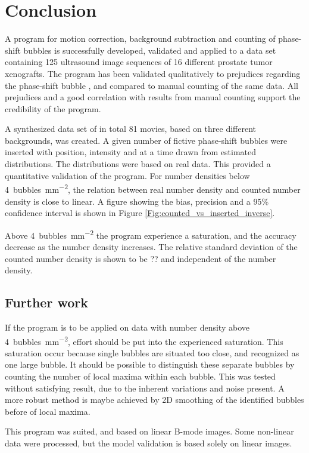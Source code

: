 
\section{Conclusion}
A program for motion correction, background subtraction and counting of phase-shift bubbles is successfully developed, validated and applied to a data set containing 125 ultrasound image sequences of 16 different prostate tumor xenografts. The program has been validated qualitatively to prejudices regarding the phase-shift bubble \texttrademark, and compared to manual counting of the same data. All prejudices and a good correlation  with results from manual counting support the credibility of the program. 

A synthesized data set of in total 81 movies, based on three different backgrounds, was created. A given number of fictive phase-shift bubbles were inserted with position, intensity and at a time drawn from estimated distributions. The distributions were based on real data. This provided a quantitative validation of the program. For number densities below \SI{4}{bubbles\per\milli\meter\squared}, the relation between real number density and counted number density is close to linear. A figure showing the bias, precision and a 95\% confidence interval is shown in Figure \ref{Fig:counted_vs_inserted_inverse}.

Above \SI{4}{bubbles\per\milli\meter\squared} the program experience a saturation, and the accuracy decrease as the number density increases. The relative standard deviation of the counted number density is shown to be ?? and independent of the number density.

\subsection{Further work}
If the program is to be applied on data with number density above \SI{4}{bubbles\per\milli\meter\squared}, effort should be put into the experienced saturation. This saturation occur because single bubbles are situated too close, and recognized as one large bubble. It should be possible to distinguish these separate bubbles by counting the number of local maxima within each bubble. This was tested without satisfying result, due to the inherent variations and noise present. A more robust method is maybe achieved by  2D smoothing of the identified bubbles before of local maxima. 
	
This program was suited, and based on linear B-mode images. Some non-linear data were processed, but the model validation is based solely on linear images. 

